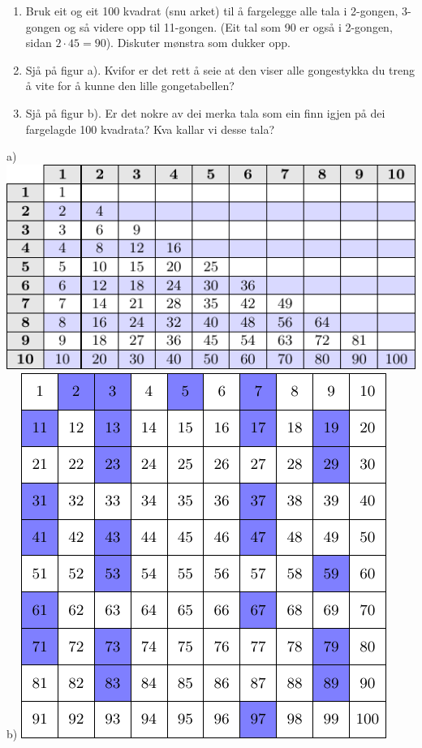 

\geometry{verbose,a4paper, inner=1cm, outer=1 cm, bmargin=2cm, tmargin=1cm}

\pagestyle{empty}
\large
\begin{enumerate}
	\item Bruk eit og eit 100 kvadrat (snu arket) til å fargelegge alle tala i 2-gongen, 3-gongen og så videre opp til 11-gongen. (Eit tal som 90 er også i 2-gongen, sidan $2\cdot45=90$). Diskuter mønstra som dukker opp.
	\item Sjå på figur a). Kvifor er det rett å seie at den viser alle gongestykka du treng å vite for å kunne den lille gongetabellen?
	\item Sjå på figur b). Er det nokre av dei merka tala som ein finn igjen på dei fargelagde 100 kvadrata? Kva kallar vi desse tala?
\end{enumerate}
\begin{center}
	a) \includegraphics{smalltimestable} \qquad b) \includegraphics{primn100}
\end{center}
